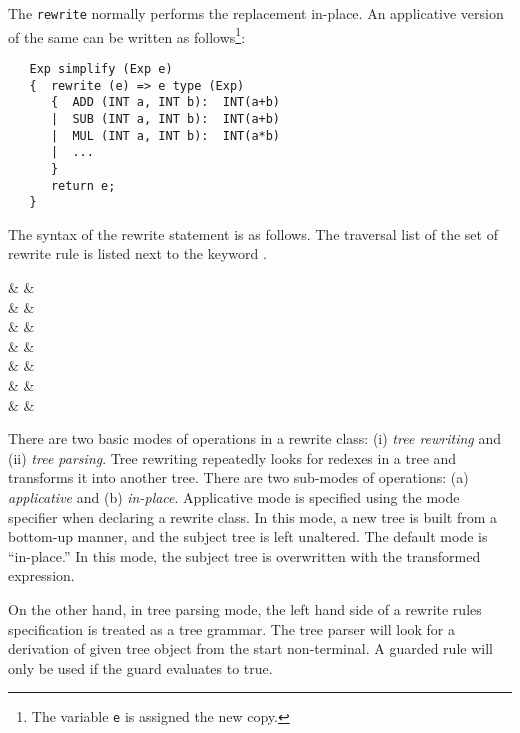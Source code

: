 The \verb|rewrite| normally performs the replacement in-place.
An applicative version of the same can be written as follows\footnote{The
variable {\tt e} is assigned the new copy.}:
 
\begin{verbatim}
   Exp simplify (Exp e)
   {  rewrite (e) => e type (Exp)
      {  ADD (INT a, INT b):  INT(a+b)
      |  SUB (INT a, INT b):  INT(a+b)
      |  MUL (INT a, INT b):  INT(a*b)
      |  ...
      }
      return e;
   }
\end{verbatim}

The syntax of the rewrite statement is as follows.  The
traversal list of the set of rewrite rule is listed next to
the keyword .
 
\begin{syntax}
   & \IS &  \T{(} \Exp \T{)}  \\
   &     & \quad {} \T{(}  \T{)} \\
   &     & \T{\{}   \T{\}} \\
   & \OR &  \T{(}  \T{)}  \\
   &    & \quad {} \T{(}  \T{)}  \\
   &    & \quad {}  \\
   &    &   \T{;} \\ 
\end{syntax}

 \label{sec:rewriting-modes}
   There are two basic modes of operations in a rewrite class: (i) 
{\em tree rewriting} and (ii) {\em tree parsing}.   
Tree rewriting repeatedly looks for redexes in a tree and transforms it into
another tree.   There are two sub-modes of operations: (a) {\em applicative}
and (b) {\em in-place}.  Applicative mode is specified using the
 mode specifier when declaring a rewrite class. 
In this mode, a new tree is built from a 
bottom-up manner, and the subject tree is left unaltered.  The default
mode is ``in-place.''  In this mode, the subject tree is overwritten
with the transformed expression.  

   On the other hand, in tree parsing mode, the left hand side
of a rewrite rules specification is treated as a tree grammar.
The tree parser will look for a derivation of given tree object from
the start non-terminal.
A guarded rule will only be used if the guard evaluates to true.

